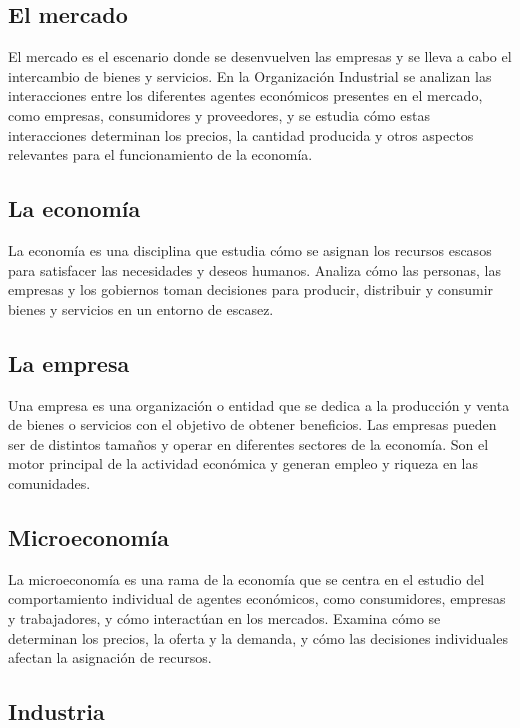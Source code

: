 \documentclass[
  doc,
  floatsintext,
  longtable,
  a4paper,
  nolmodern,
  notxfonts,
  notimes,
  colorlinks=true,linkcolor=blue,citecolor=blue,urlcolor=blue]{apa7}
\begin{document}
\subsection{El mercado}\label{el-mercado}

El mercado es el escenario donde se desenvuelven las empresas y se lleva
a cabo el intercambio de bienes y servicios. En la Organización
Industrial se analizan las interacciones entre los diferentes agentes
económicos presentes en el mercado, como empresas, consumidores y
proveedores, y se estudia cómo estas interacciones determinan los
precios, la cantidad producida y otros aspectos relevantes para el
funcionamiento de la economía.

\subsection{La economía}\label{la-economuxeda}

La economía es una disciplina que estudia cómo se asignan los recursos
escasos para satisfacer las necesidades y deseos humanos. Analiza cómo
las personas, las empresas y los gobiernos toman decisiones para
producir, distribuir y consumir bienes y servicios en un entorno de
escasez.

\subsection{La empresa}\label{la-empresa}

Una empresa es una organización o entidad que se dedica a la producción
y venta de bienes o servicios con el objetivo de obtener beneficios. Las
empresas pueden ser de distintos tamaños y operar en diferentes sectores
de la economía. Son el motor principal de la actividad económica y
generan empleo y riqueza en las comunidades.

\subsection{Microeconomía}\label{microeconomuxeda}

La microeconomía es una rama de la economía que se centra en el estudio
del comportamiento individual de agentes económicos, como consumidores,
empresas y trabajadores, y cómo interactúan en los mercados. Examina
cómo se determinan los precios, la oferta y la demanda, y cómo las
decisiones individuales afectan la asignación de recursos.

\subsection{Industria}\label{industria}
\end{document}
